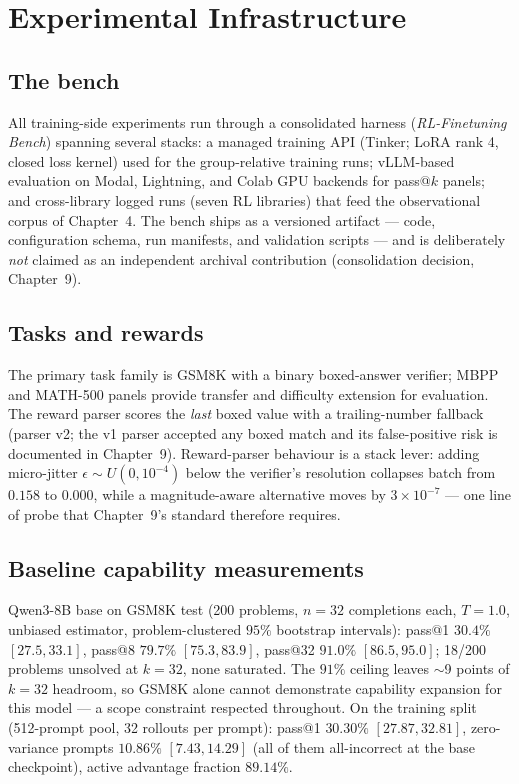 \chapter{Experimental Infrastructure}
\label{ch:infra}

\section{The bench}
All training-side experiments run through a consolidated harness
(\emph{RL-Finetuning Bench}) spanning several stacks: a managed training API
(Tinker; LoRA rank 4, closed loss kernel) used for the group-relative training
runs; vLLM-based evaluation on Modal, Lightning, and Colab GPU backends for
pass@$k$ panels; and cross-library logged runs (seven RL libraries) that feed
the observational \ZVF{} corpus of Chapter~4. The bench ships as a versioned
artifact --- code, configuration schema, run manifests, and validation
scripts --- and is deliberately \emph{not} claimed as an independent archival
contribution (consolidation decision, Chapter~9).

\section{Tasks and rewards}
The primary task family is GSM8K with a binary boxed-answer verifier; MBPP and
MATH-500 panels provide transfer and difficulty extension for evaluation.
The reward parser scores the \emph{last} boxed value with a trailing-number
fallback (parser v2; the v1 parser accepted any boxed match and its
false-positive risk is documented in Chapter~9). Reward-parser behaviour is a
stack lever: adding micro-jitter $\epsilon\sim U(0,10^{-4})$ below the
verifier's resolution collapses batch \ZVF{} from $0.158$ to $0.000$, while a
magnitude-aware alternative moves by $3\times10^{-7}$ --- one line of probe
that Chapter~9's standard therefore requires.

\section{Baseline capability measurements}
Qwen3-8B base on GSM8K test (200 problems, $n{=}32$ completions each,
$T{=}1.0$, unbiased estimator, problem-clustered $95\%$ bootstrap intervals):
pass@1 $30.4\%$ $[27.5,33.1]$, pass@8 $79.7\%$ $[75.3,83.9]$, pass@32 $91.0\%$
$[86.5,95.0]$; 18/200 problems unsolved at $k{=}32$, none saturated. The
$91\%$ ceiling leaves $\sim$9 points of $k{=}32$ headroom, so GSM8K alone
cannot demonstrate capability expansion for this model --- a scope constraint
respected throughout. On the training split (512-prompt pool, 32 rollouts per
prompt): pass@1 $30.30\%$ $[27.87, 32.81]$, zero-variance prompts $10.86\%$
$[7.43,14.29]$ (all of them all-incorrect at the base checkpoint), active
advantage fraction $89.14\%$.

